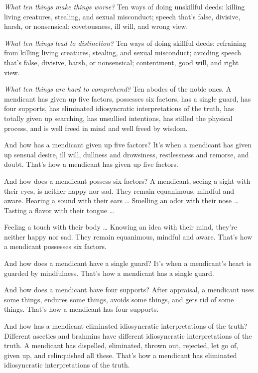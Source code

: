 \documentclass[12pt,openany]{book}%
\begin{document}
\emph{What ten things make things worse?} Ten ways of doing unskillful deeds: killing living creatures, stealing, and sexual misconduct; speech that’s false, divisive, harsh, or nonsensical; covetousness, ill will, and wrong view. 

\emph{What ten things lead to distinction?} Ten ways of doing skillful deeds: refraining from killing living creatures, stealing, and sexual misconduct; avoiding speech that’s false, divisive, harsh, or nonsensical; contentment, good will, and right view. 

\emph{What ten things are hard to comprehend?} Ten abodes of the noble ones. A mendicant has given up five factors, possesses six factors, has a single guard, has four supports, has eliminated idiosyncratic interpretations of the truth, has totally given up searching, has unsullied intentions, has stilled the physical process, and is well freed in mind and well freed by wisdom. 

And how has a mendicant given up five factors? It’s when a mendicant has given up sensual desire, ill will, dullness and drowsiness, restlessness and remorse, and doubt. That’s how a mendicant has given up five factors. 

And how does a mendicant possess six factors? A mendicant, seeing a sight with their eyes, is neither happy nor sad. They remain equanimous, mindful and aware. Hearing a sound with their ears … Smelling an odor with their nose … Tasting a flavor with their tongue … 

Feeling a touch with their body … Knowing an idea with their mind, they’re neither happy nor sad. They remain equanimous, mindful and aware. That’s how a mendicant possesses six factors. 

And how does a mendicant have a single guard? It’s when a mendicant’s heart is guarded by mindfulness. That’s how a mendicant has a single guard. 

And how does a mendicant have four supports? After appraisal, a mendicant uses some things, endures some things, avoids some things, and gets rid of some things. That’s how a mendicant has four supports. 

And how has a mendicant eliminated idiosyncratic interpretations of the truth? Different ascetics and brahmins have different idiosyncratic interpretations of the truth. A mendicant has dispelled, eliminated, thrown out, rejected, let go of, given up, and relinquished all these. That’s how a mendicant has eliminated idiosyncratic interpretations of the truth. 
\end{document}
